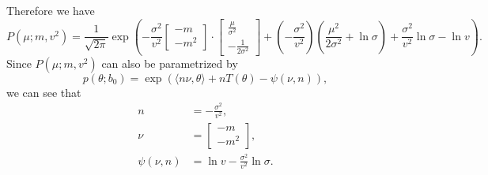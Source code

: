 \documentclass[12pt]{article}
\begin{document}
Therefore we have \[P\left( \mu;m,v^2 \right)=\frac{1}{\sqrt{2\pi}}\exp\left( -\frac{\sigma^2}{v^2}\begin{bmatrix}
      -m \\-m^2
    \end{bmatrix}\cdot\begin{bmatrix}
      \frac{\mu}{\sigma^2} \\-\frac{1}{2\sigma^2}
    \end{bmatrix}+\left( -\frac{\sigma^2}{v^2}\right)\left( \frac{\mu^2}{2\sigma^2}+\ln\sigma \right)+\frac{\sigma^2}{v^2}\ln\sigma-\ln v  \right).\]
Since $P(\mu;m,v^2)$ can also be parametrized by \[ p(\theta;b_0)=\exp\left( \langle n\nu,\theta\rangle+nT(\theta)-\psi(\nu,n) \right), \] we can see that
\begin{align*}
  n           & =-\frac{\sigma^2}{v^2},              \\
  \nu         & =\begin{bmatrix}
    -m \\-m^2
  \end{bmatrix},         \\
  \psi(\nu,n) & =\ln v-\frac{\sigma^2}{v^2}\ln\sigma.
\end{align*}
\end{document}
